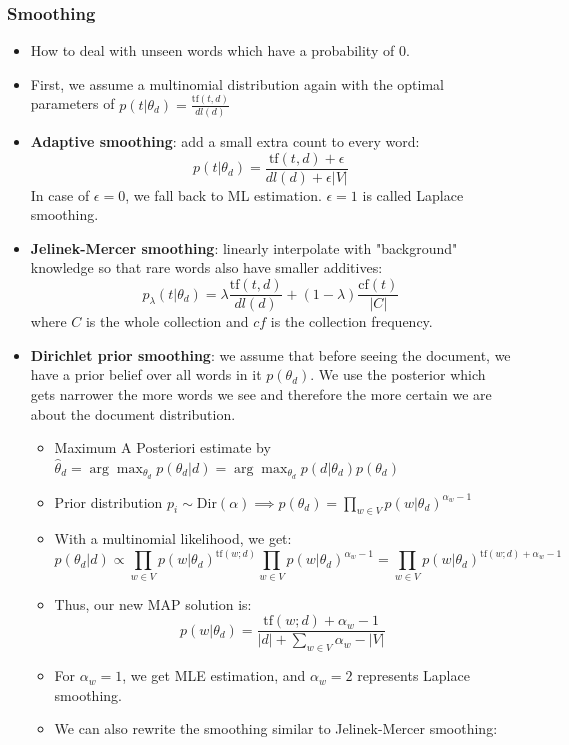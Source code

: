 \subsubsection{Smoothing}
\begin{itemize}
	\item How to deal with unseen words which have a probability of 0.
	\item First, we assume a multinomial distribution again with the optimal parameters of $p(t|\theta_d) = \frac{\text{tf}(t,d)}{dl(d)}$
	\item \textbf{Adaptive smoothing}: add a small extra count to every word:
	$$p(t|\theta_d) = \frac{\text{tf}(t,d) + \epsilon}{dl(d) + \epsilon |V|}$$
	In case of $\epsilon=0$, we fall back to ML estimation. $\epsilon=1$ is called Laplace smoothing.
	\item \textbf{Jelinek-Mercer smoothing}: linearly interpolate with "background" knowledge so that rare words also have smaller additives:
	$$p_{\lambda}(t|\theta_d) = \lambda \frac{\text{tf}(t,d)}{dl(d)} + (1 - \lambda) \frac{\text{cf}(t)}{|C|}$$
	where $C$ is the whole collection and $cf$ is the collection frequency.
	\item \textbf{Dirichlet prior smoothing}: we assume that before seeing the document, we have a prior belief over all words in it $p(\theta_d)$. We use the posterior which gets narrower the more words we see and therefore the more certain we are about the document distribution.
	\begin{itemize}
		\item Maximum A Posteriori estimate by $\hat{\theta}_d = \arg\max_{\theta_d} p(\theta_d|d) = \arg\max_{\theta_d} p(d|\theta_d) p(\theta_d)$
		\item Prior distribution $p_i\sim \text{Dir}(\alpha) \implies p(\theta_d) = \prod\limits_{w \in V} p(w|\theta_d)^{\alpha_w - 1}$
		\item With a multinomial likelihood, we get:
		$$p(\theta_d | d) \propto \prod\limits_{w \in V} p(w|\theta_d)^{\text{tf}(w;d)} \prod\limits_{w \in V} p(w|\theta_d)^{\alpha_w - 1} = \prod\limits_{w \in V} p(w|\theta_d)^{\text{tf}(w;d) + \alpha_w - 1}$$
		\item Thus, our new MAP solution is:
		$$p(w|\theta_d) = \frac{\text{tf}(w;d) + \alpha_w - 1}{|d| + \sum_{w\in V}\alpha_w - |V|}$$
		\item For $\alpha_w = 1$, we get MLE estimation, and $\alpha_w = 2$ represents Laplace smoothing.
		\item We can also rewrite the smoothing similar to Jelinek-Mercer smoothing:

\end{itemize}
\end{itemize}
